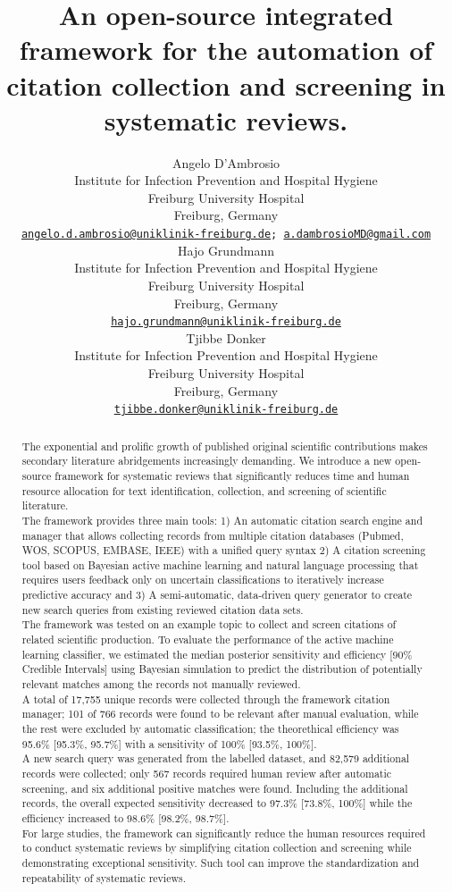 \documentclass{article}
\title{An open-source integrated framework for the automation of
citation collection and screening in systematic reviews.}
\author{
    Angelo D'Ambrosio
   \\
    Institute for Infection Prevention and Hospital Hygiene \\
    Freiburg University Hospital \\
  Freiburg, Germany \\
  \texttt{\href{mailto:angelo.d.ambrosio@uniklinik-freiburg.de}{\nolinkurl{angelo.d.ambrosio@uniklinik-freiburg.de}};
\href{mailto:a.dambrosioMD@gmail.com}{\nolinkurl{a.dambrosioMD@gmail.com}}} \\
   \And
    Hajo Grundmann
   \\
    Institute for Infection Prevention and Hospital Hygiene \\
    Freiburg University Hospital \\
  Freiburg, Germany \\
  \texttt{\href{mailto:hajo.grundmann@uniklinik-freiburg.de}{\nolinkurl{hajo.grundmann@uniklinik-freiburg.de}}} \\
   \And
    Tjibbe Donker
   \\
    Institute for Infection Prevention and Hospital Hygiene \\
    Freiburg University Hospital \\
  Freiburg, Germany \\
  \texttt{\href{mailto:tjibbe.donker@uniklinik-freiburg.de}{\nolinkurl{tjibbe.donker@uniklinik-freiburg.de}}} \\
  }
\begin{document}
\maketitle


\begin{abstract}
The exponential and prolific growth of published original scientific
contributions makes secondary literature abridgements increasingly
demanding. We introduce a new open-source framework for systematic
reviews that significantly reduces time and human resource allocation
for text identification, collection, and screening of scientific
literature.\\
The framework provides three main tools: 1) An automatic citation search
engine and manager that allows collecting records from multiple citation
databases (Pubmed, WOS, SCOPUS, EMBASE, IEEE) with a unified query
syntax 2) A citation screening tool based on Bayesian active machine
learning and natural language processing that requires users feedback
only on uncertain classifications to iteratively increase predictive
accuracy and 3) A semi-automatic, data-driven query generator to create
new search queries from existing reviewed citation data sets.\\
The framework was tested on an example topic to collect and screen
citations of related scientific production. To evaluate the performance
of the active machine learning classifier, we estimated the median
posterior sensitivity and efficiency {[}90\% Credible Intervals{]} using
Bayesian simulation to predict the distribution of potentially relevant
matches among the records not manually reviewed.\\
A total of 17,755 unique records were collected through the framework
citation manager; 101 of 766 records were found to be relevant after
manual evaluation, while the rest were excluded by automatic
classification; the theorethical efficiency was 95.6\% {[}95.3\%,
95.7\%{]} with a sensitivity of 100\% {[}93.5\%, 100\%{]}.\\
A new search query was generated from the labelled dataset, and 82,579
additional records were collected; only 567 records required human
review after automatic screening, and six additional positive matches
were found. Including the additional records, the overall expected
sensitivity decreased to 97.3\% {[}73.8\%, 100\%{]} while the efficiency
increased to 98.6\% {[}98.2\%, 98.7\%{]}.\\
For large studies, the framework can significantly reduce the human
resources required to conduct systematic reviews by simplifying citation
collection and screening while demonstrating exceptional sensitivity.
Such tool can improve the standardization and repeatability of
systematic reviews.
\end{abstract}
\end{document}
